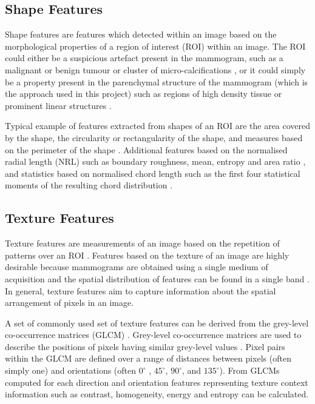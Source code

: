 \subsection{Shape Features}
Shape features are features which detected within an image based on the morphological properties of a region of interest (ROI) within an image. The ROI could either be a suspicious artefact present in the mammogram, such as a malignant or benign tumour or cluster of micro-calcifications \cite{cheng2006approaches}, or it could simply be a property present in the parenchymal structure of the mammogram (which is the approach used in this project) such as regions of high density tissue \cite{chen2013multiscale} or prominent linear structures \cite{zwiggelaar1996finding}.

Typical example of features extracted from shapes of an ROI are the area covered by the shape, the circularity or rectangularity of the shape, and measures based on the perimeter of the shape \cite{petrick1999combined}. Additional features based on the normalised radial length (NRL) \cite{kilday1993classifying} such as boundary roughness, mean, entropy and area ratio \cite{petrick1999combined, petrick1996automated}, and statistics based on normalised chord length \cite{you1984performance} such as the first four statistical  moments of the resulting chord distribution \cite{el1996shape}.

\subsection{Texture Features}
Texture features are measurements of an image based on the repetition of patterns over an ROI \cite{parker2010algorithms}. Features based on the texture of an image are highly desirable because mammograms are obtained using a single medium of acquisition and the spatial distribution of features can be found in a single band \cite{ganesan2013computer}. In general, texture features aim to capture information about the spatial arrangement of pixels in an image.

A set of commonly used set of texture features can be derived from the grey-level co-occurrence matrices (GLCM) \cite{haralick1973textural}. Grey-level co-occurrence matrices are used to describe the positions of pixels having similar grey-level values \cite{parker2010algorithms}. Pixel pairs within the GLCM are defined over a range of distances between pixels (often simply one) and orientations (often $0^\circ$ , $45^\circ$, $90^\circ$, and $135^\circ$). From GLCMs computed for each direction and orientation features representing texture context information such as  contrast, homogeneity, energy and entropy \cite{haralick1973textural, cheng2006approaches, parker2010algorithms} can be calculated.

